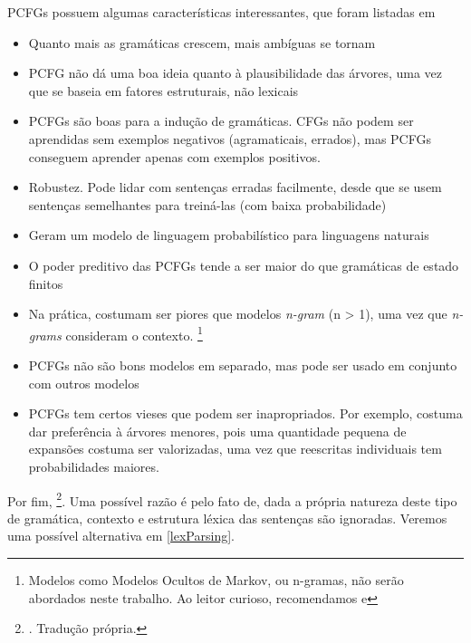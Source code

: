 PCFGs possuem algumas características interessantes, que foram listadas em 
\begin{itemize}
    \item Quanto mais as gramáticas crescem, mais ambíguas se tornam
    \item PCFG não dá uma boa ideia quanto à plausibilidade das árvores, uma vez que se baseia em fatores estruturais, não lexicais
    \item PCFGs são boas para a indução de gramáticas.  CFGs não podem ser aprendidas sem exemplos negativos (agramaticais, errados), mas PCFGs conseguem aprender apenas com exemplos positivos. 
    \item Robustez. Pode lidar com sentenças erradas facilmente, desde que se usem sentenças semelhantes para treiná-las (com baixa probabilidade)
    \item Geram um modelo de linguagem probabilístico para linguagens naturais
    \item O poder preditivo das PCFGs tende a ser maior do que gramáticas de estado finitos
    \item Na prática, costumam ser piores que modelos \textit{n-gram} (n > 1), uma vez que \textit{n-grams} consideram o contexto.
    \footnote{Modelos como Modelos Ocultos de Markov, ou n-gramas, não serão abordados neste trabalho. Ao leitor curioso, recomendamos  e }
    \item PCFGs não são bons modelos em separado, mas pode ser usado em conjunto com outros modelos
    \item PCFGs tem certos vieses que podem ser inapropriados. Por exemplo, costuma dar preferência à árvores menores, pois uma quantidade pequena de expansões costuma ser valorizadas, uma vez que reescritas individuais tem probabilidades maiores.
\end{itemize}

Por fim,  
\footnote{. Tradução própria.}. Uma possível razão é pelo fato de, dada a própria natureza deste tipo de gramática, contexto e estrutura léxica das sentenças são ignoradas. Veremos uma possível alternativa em \ref{lexParsing}.

